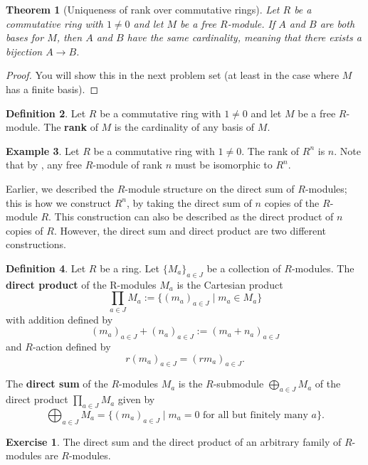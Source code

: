 \documentclass[12pt]{report}
\newtheorem{theorem}{Theorem}[chapter]
\numberwithin{equation}{section}
\numberwithin{theorem}{chapter}
\theoremstyle{definition}
\newtheorem{definition}[theorem]{Definition}
\newtheorem{example}[theorem]{Example}
\newtheorem{exercise}{Exercise}
\newtheorem*{basic properties}{Basic Properties}
\newtheorem*{Important Remark}{Important Remark}
\newcommand{\df}[1]{{\bf #1}\index{#1}}
\begin{document}
\begin{theorem}[Uniqueness of rank over commutative rings]\label{thm:rank}
Let $R$ be a commutative ring with $1 \neq 0$ and let $M$ be a free $R$-module. If $A$ and $B$ are both bases for $M$, then $A$ and $B$ have the same cardinality, meaning that there exists a bijection $A \to B$.
\end{theorem}

\begin{proof}
You will show this in the next problem set (at least in the case where $M$ has a finite basis).
\end{proof}


\begin{definition}
Let $R$ be a commutative ring with $1\neq 0$ and let $M$ be a free $R$-module. The  \df{rank} of $M$ is the cardinality of any basis of $M$.
\end{definition}

\begin{example}
Let $R$ be a commutative ring with $1 \neq 0$. The rank of $R^n$ is $n$. Note that by , any free $R$-module of rank $n$ must be isomorphic to $R^n$.
\end{example}


Earlier, we described the $R$-module structure on the direct sum of $R$-modules; this is how we construct $R^n$, by taking the direct sum of $n$ copies of the $R$-module $R$. This construction can also be described as the direct product of $n$ copies of $R$. However, the direct sum and direct product are two different constructions.



\begin{definition}
Let $R$ be a ring. Let $\{ M_a \}_{a \in J}$ be a collection of $R$-modules. The \df{direct product} of the R-modules $M_a$ is the Cartesian product 
$$\prod_{a \in J} M_a := \{ (m_a)_{a \in J} \mid m_a \in M_a \}$$ 
with addition defined by 
$$(m_a)_{a \in J}+(n_a)_{a \in J} := (m_a+n_a)_{a \in J}$$
and $R$-action defined by $$r(m_a)_{a \in J} = (rm_a)_{a \in J}.$$ 

The \df{direct sum} of the $R$-modules $M_a$ is the $R$-submodule $\bigoplus_{a \in J} M_a$ of the direct product $\prod_{a \in J} M_a$ given by 
$$\bigoplus_{a \in J} M_a = \{(m_a)_{a \in J} \mid m_a = 0 \text{ for all but finitely many } a \}.$$
\end{definition}

\begin{exercise}
The direct sum and the direct product of an arbitrary family of $R$-modules are $R$-modules.
\end{exercise}
\end{document}
